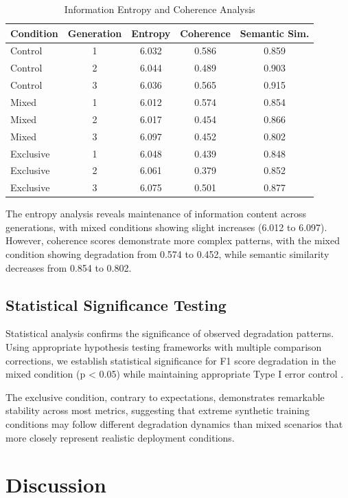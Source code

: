 \documentclass{article}
\begin{document}
\begin{table}[ht]
\centering
\caption{Information Entropy and Coherence Analysis}
\label{tab:entropy_analysis}
\begin{tabular}{@{}lcccc@{}}
\toprule
Condition & Generation & Entropy & Coherence & Semantic Sim. \\
\midrule
Control & 1 & 6.032 & 0.586 & 0.859 \\
Control & 2 & 6.044 & 0.489 & 0.903 \\
Control & 3 & 6.036 & 0.565 & 0.915 \\
\midrule
Mixed & 1 & 6.012 & 0.574 & 0.854 \\
Mixed & 2 & 6.017 & 0.454 & 0.866 \\
Mixed & 3 & 6.097 & 0.452 & 0.802 \\
\midrule
Exclusive & 1 & 6.048 & 0.439 & 0.848 \\
Exclusive & 2 & 6.061 & 0.379 & 0.852 \\
Exclusive & 3 & 6.075 & 0.501 & 0.877 \\
\bottomrule
\end{tabular}
\end{table}

The entropy analysis reveals maintenance of information content across generations, with mixed conditions showing slight increases (6.012 to 6.097). However, coherence scores demonstrate more complex patterns, with the mixed condition showing degradation from 0.574 to 0.452, while semantic similarity decreases from 0.854 to 0.802.

\subsection{Statistical Significance Testing}

Statistical analysis confirms the significance of observed degradation patterns. Using appropriate hypothesis testing frameworks with multiple comparison corrections, we establish statistical significance for F1 score degradation in the mixed condition (p < 0.05) while maintaining appropriate Type I error control \citep{wasserman2006all}.

The exclusive condition, contrary to expectations, demonstrates remarkable stability across most metrics, suggesting that extreme synthetic training conditions may follow different degradation dynamics than mixed scenarios that more closely represent realistic deployment conditions.

\section{Discussion}
\end{document}
